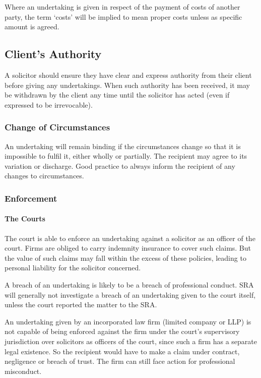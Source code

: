 \documentclass[
]{article}
\begin{document}
Where an undertaking is given in respect of the payment of costs of
another party, the term `costs' will be implied to mean proper costs
unless as specific amount is agreed.

\hypertarget{clients-authority}{%
\subsection{Client's Authority}\label{clients-authority}}

A solicitor should ensure they have clear and express authority from
their client before giving any undertakings. When such authority has
been received, it may be withdrawn by the client any time until the
solicitor has acted (even if expressed to be irrevocable).

\hypertarget{change-of-circumstances}{%
\subsubsection{Change of Circumstances}\label{change-of-circumstances}}

An undertaking will remain binding if the circumstances change so that
it is impossible to fulfil it, either wholly or partially. The recipient
may agree to its variation or discharge. Good practice to always inform
the recipient of any changes to circumstances.

\hypertarget{enforcement}{%
\subsubsection{Enforcement}\label{enforcement}}

\hypertarget{the-courts}{%
\paragraph{The Courts}\label{the-courts}}

The court is able to enforce an undertaking against a solicitor as an
officer of the court. Firms are obliged to carry indemnity insurance to
cover such claims. But the value of such claims may fall within the
excess of these policies, leading to personal liability for the
solicitor concerned.

A breach of an undertaking is likely to be a breach of professional
conduct. SRA will generally not investigate a breach of an undertaking
given to the court itself, unless the court reported the matter to the
SRA.

An undertaking given by an incorporated law firm (limited company or
LLP) is not capable of being enforced against the firm under the court's
supervisory jurisdiction over solicitors as officers of the court, since
such a firm has a separate legal existence. So the recipient would have
to make a claim under contract, negligence or breach of trust. The firm
can still face action for professional misconduct.
\end{document}
